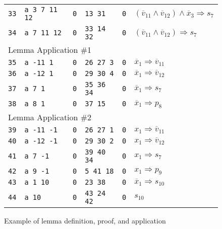 \documentclass[letterpaper,USenglish,cleveref, autoref, thm-restate]{lipics-v2021}
\newcommand{\obar}[1]{\overline{#1}}
\newcommand{\imply}{\Rightarrow}
\begin{document}
\begin{figure}
\begin{tabular}{llllll}
\texttt{33} & \texttt{a 3 7 11 12} & \texttt{0} & \texttt{13 31} & \texttt{0} & $(\obar{v}_{11} \land \obar{v}_{12}) \land \obar{x}_3 \imply s_{7}$ \\
\texttt{34} & \texttt{a 7 11 12} & \texttt{0} & \texttt{33 14 32} & \texttt{0} & $(\obar{v}_{11} \land \obar{v}_{12}) \imply s_{7}$ \\
\midrule
\multicolumn{6}{l}{Lemma Application \#1} \\
\texttt{35} & \texttt{a -11 1} & \texttt{0} & \texttt{26 27 3} & \texttt{0} & $\obar{x}_1 \imply \obar{v}_{11}$ \\
\texttt{36} & \texttt{a -12 1} & \texttt{0} & \texttt{29 30 4} & \texttt{0} & $\obar{x}_1 \imply \obar{v}_{12}$ \\
\texttt{37} & \texttt{a 7 1} & \texttt{0} & \texttt{35 36 34} & \texttt{0} & $\obar{x}_1 \imply s_7$ \\
\midrule
\texttt{38} & \texttt{a 8 1} & \texttt{0} & \texttt{37 15} & \texttt{0} & $\obar{x}_1 \imply p_8$ \\
\midrule
\multicolumn{6}{l}{Lemma Application \#2} \\
\texttt{39} & \texttt{a -11 -1} & \texttt{0} & \texttt{26 27 1} & \texttt{0} & ${x}_1 \imply \obar{v}_{11}$ \\
\texttt{40} & \texttt{a -12 -1} & \texttt{0} & \texttt{29 30 2} & \texttt{0} & ${x}_1 \imply \obar{v}_{12}$ \\
\texttt{41} & \texttt{a 7 -1} & \texttt{0} & \texttt{39 40 34} & \texttt{0} & ${x}_1 \imply s_7$ \\
\midrule
\texttt{42} & \texttt{a 9 -1} & \texttt{0} & \texttt{5 41 18} & \texttt{0} & ${x}_1 \imply p_9$ \\
\texttt{43} & \texttt{a 1 10} & \texttt{0} & \texttt{23 38} & \texttt{0} & $\obar{x}_1 \imply s_{10}$  \\
\texttt{44} & \texttt{a 10} & \texttt{0} & \texttt{43 24 42} & \texttt{0} & $s_{10}$ \\
\bottomrule
\end{tabular}
\caption{Example of lemma definition, proof, and application}
\label{fig:eg4:lemmas}
\end{figure}
\end{document}
